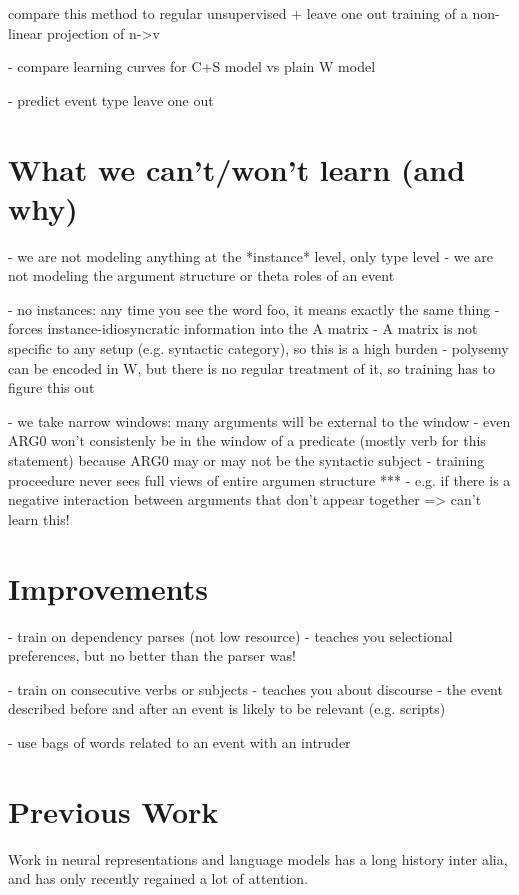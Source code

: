 \documentclass[11pt,letterpaper]{article}
\begin{document}
	compare this method to regular unsupervised + leave one out training of a non-linear projection of n->v

- compare learning curves for C+S model vs plain W model

- predict event type leave one out




\section{What we can't/won't learn (and why)} %
\label{section:unlearnability}
- we are not modeling anything at the *instance* level, only type level
- we are not modeling the argument structure or theta roles of an event

- no instances: any time you see the word foo, it means exactly the same thing
	- forces instance-idiosyncratic information into the A matrix
	- A matrix is not specific to any setup (e.g. syntactic category), so this is a high burden
	- polysemy can be encoded in W, but there is no regular treatment of it, so training has to figure this out

- we take narrow windows: many arguments will be external to the window
	- even ARG0 won't consistenly be in the window of a predicate (mostly verb for this statement)
		because ARG0 may or may not be the syntactic subject
	- training proceedure never sees full views of entire argumen structure
	***	- e.g. if there is a negative interaction between arguments that don't appear together => can't learn this!


\section{Improvements}

- train on dependency parses (not low resource)
	- teaches you selectional preferences, but no better than the parser was!

- train on consecutive verbs or subjects
	- teaches you about discourse
	- the event described before and after an event is likely to be relevant (e.g. scripts)

- use bags of words related to an event with an intruder




\section{Previous Work} %
Work in neural representations and language models has a long history
\cite{foundation1,foundation2,foundation3} inter alia,
and has only recently regained a lot of attention.
\end{document}
